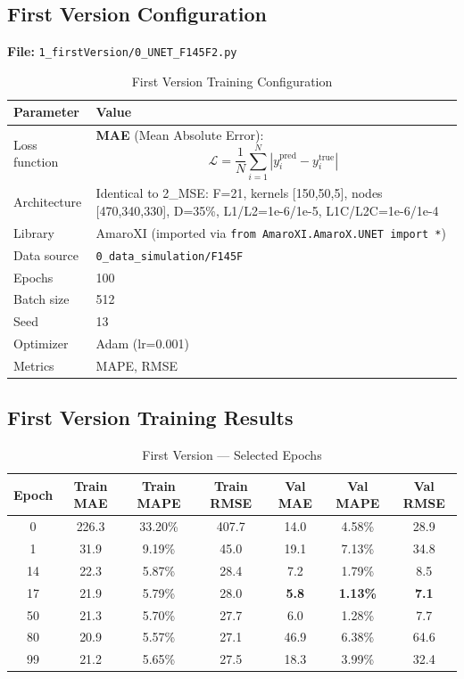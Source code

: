 \documentclass[11pt,a4paper]{article}
\begin{document}
\subsection{First Version Configuration}

\textbf{File:} \texttt{1\_firstVersion/0\_UNET\_F145F2.py}

\begin{table}[H]
\centering
\caption{First Version Training Configuration}
\begin{tabular}{ll}
\toprule
\textbf{Parameter} & \textbf{Value} \\
\midrule
Loss function & \textbf{MAE} (Mean Absolute Error):
\begin{equation*}
\mathcal{L} = \frac{1}{N}\sum_{i=1}^{N}|y_i^{\text{pred}} - y_i^{\text{true}}|
\end{equation*} \\
Architecture & Identical to 2\_MSE: F=21, kernels [150,50,5], nodes [470,340,330], D=35\%, L1/L2=1e-6/1e-5, L1C/L2C=1e-6/1e-4 \\
Library & AmaroXI (imported via {\tt from AmaroXI.AmaroX.UNET import *}) \\
Data source & \texttt{0\_data\_simulation/F145F} \\
Epochs & 100 \\
Batch size & 512 \\
Seed & 13 \\
Optimizer & Adam (lr=0.001) \\
Metrics & MAPE, RMSE \\
\bottomrule
\end{tabular}
\end{table}

\subsection{First Version Training Results}

\begin{table}[H]
\centering
\caption{First Version — Selected Epochs}
\begin{tabular}{ccccccc}
\toprule
\textbf{Epoch} & \textbf{Train MAE} & \textbf{Train MAPE} & \textbf{Train RMSE} & \textbf{Val MAE} & \textbf{Val MAPE} & \textbf{Val RMSE} \\
\midrule
0  & 226.3 & 33.20\% & 407.7 & 14.0 & 4.58\% & 28.9 \\
1  & 31.9  & 9.19\%  & 45.0  & 19.1 & 7.13\% & 34.8 \\
14 & 22.3  & 5.87\%  & 28.4  & 7.2  & 1.79\% & 8.5  \\
17 & 21.9  & 5.79\%  & 28.0  & \textbf{5.8} & \textbf{1.13\%} & \textbf{7.1} \\
50 & 21.3  & 5.70\%  & 27.7  & 6.0  & 1.28\% & 7.7  \\
80 & 20.9  & 5.57\%  & 27.1  & 46.9 & 6.38\% & 64.6 \\
99 & 21.2  & 5.65\%  & 27.5  & 18.3 & 3.99\% & 32.4 \\
\bottomrule
\end{tabular}
\end{table}
\end{document}
